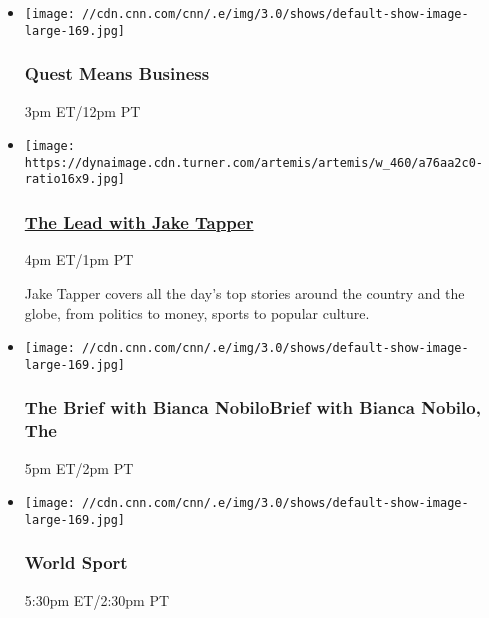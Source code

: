 \begin{itemize}
\item
  \texttt{[image: //cdn.cnn.com/cnn/.e/img/3.0/shows/default-show-image-large-169.jpg]}

  \hypertarget{quest-means-business-1}{%
  \subsubsection{Quest Means Business}\label{quest-means-business-1}}

  3pm ET/12pm PT
\end{itemize}

\begin{itemize}
\item
  \href{/specials/tv/all-shows}{}

  \texttt{[image: https://dynaimage.cdn.turner.com/artemis/artemis/w\_460/a76aa2c0-ratio16x9.jpg]}

  \hypertarget{the-lead-with-jake-tapper-1}{%
  \subsubsection{\texorpdfstring{\href{/specials/tv/all-shows}{The Lead
  with Jake
  Tapper}}{The Lead with Jake Tapper}}\label{the-lead-with-jake-tapper-1}}

  4pm ET/1pm PT

  Jake Tapper covers all the day's top stories around the country and
  the globe, from politics to money, sports to popular culture.
\end{itemize}

\begin{itemize}
\item
  \texttt{[image: //cdn.cnn.com/cnn/.e/img/3.0/shows/default-show-image-large-169.jpg]}

  \hypertarget{the-brief-with-bianca-nobilobrief-with-bianca-nobilo-the--1}{%
  \subsubsection{The Brief with Bianca NobiloBrief with Bianca Nobilo,
  The
  }\label{the-brief-with-bianca-nobilobrief-with-bianca-nobilo-the--1}}

  5pm ET/2pm PT
\end{itemize}

\begin{itemize}
\item
  \texttt{[image: //cdn.cnn.com/cnn/.e/img/3.0/shows/default-show-image-large-169.jpg]}

  \hypertarget{world-sport-12}{%
  \subsubsection{World Sport}\label{world-sport-12}}

  5:30pm ET/2:30pm PT
\end{itemize}

